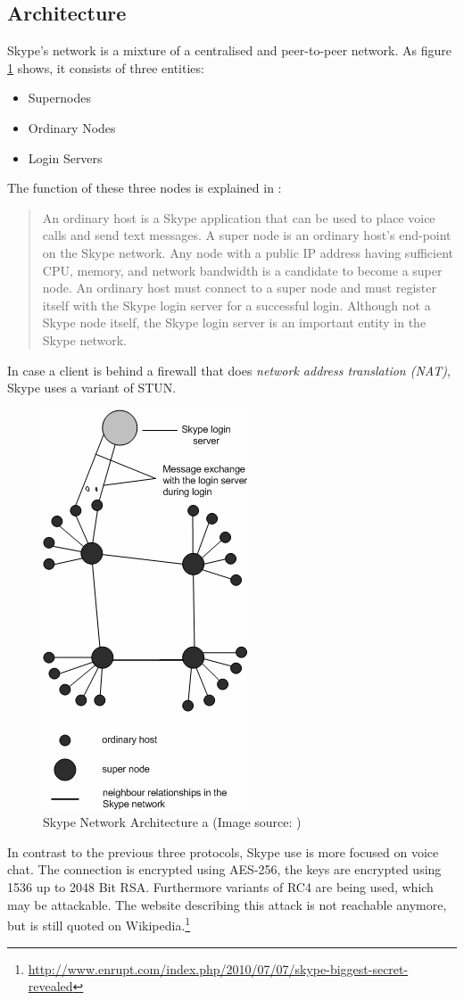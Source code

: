 \subsection{Architecture}
Skype's network is a mixture of a centralised and peer-to-peer network.
As figure \ref{skypearch} shows, it consists of three entities:
\begin{itemize}
\item Supernodes
\item Ordinary Nodes
\item Login Servers
\end{itemize}
The function of these three nodes is explained in \cite{skype-analysis}:
\begin{quote}
An ordinary host is
a Skype application that can be used to place voice calls and send
text messages. A super node is an ordinary host’s end-point on the
Skype network. Any node with a public IP address having
sufficient CPU, memory, and network bandwidth is a candidate to
become a super node. An ordinary host must connect to a super
node and must register itself with the Skype login server for a
successful login. Although not a Skype node itself, the Skype
login server is an important entity in the Skype network.
\end{quote}
In case a client is behind a firewall that does
\textit{network address translation (NAT)}, 
Skype uses a variant of STUN\cite{rfc5389}.
\begin{figure}
    \centering
    \caption[Skype Network Architecture]{Skype Network Architecture a (Image source: \cite{skype-analysis})}
    \label{skypearch}
    \includegraphics[scale=0.8]{skype-network.png}
\end{figure}
In contrast to the previous three protocols, Skype use is more focused on voice chat.
The connection is encrypted using AES-256, the keys are encrypted using
1536 up to 2048 Bit RSA.
Furthermore variants of RC4 are being used, which may be attackable.
The website describing this attack is not reachable anymore, but 
is still quoted
on Wikipedia.\footnote{\url{http://www.enrupt.com/index.php/2010/07/07/skype-biggest-secret-revealed}}
